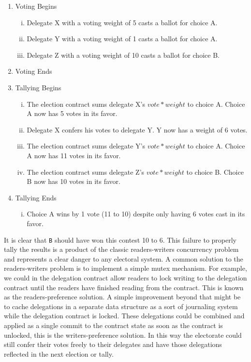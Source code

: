 \begin{enumerate}
    \item Voting Begins
    \begin{enumerate}[i.]
        \item Delegate X with a voting weight of 5 casts a ballot for choice A.
        \item Delegate Y with a voting weight of 1 casts a ballot for choice A.
        \item Delegate Z with a voting weight of 10 casts a ballot for choice B.
    \end{enumerate}
    \item Voting Ends
    \item Tallying Begins
    \begin{enumerate}[i.]
        \item The election contract sums delegate X's $vote*weight$ to choice A.
            Choice A now has 5 votes in its favor.
        \item Delegate X confers his votes to delegate Y. Y now has a weight of
            6 votes.
        \item The election contract sums delegate Y's $vote*weight$ to choice A.
            Choice A now has 11 votes in its favor.
        \item The election contract sums delegate Z's $vote*weight$ to choice B.
            Choice B now has 10 votes in its favor.
    \end{enumerate}
    \item Tallying Ends
    \begin{enumerate}[i.]
        \item Choice A wins by 1 vote (11 to 10) despite only having 6 votes
            cast in its favor.
    \end{enumerate}
\end{enumerate}

It is clear that \lstinline|B| should have won this contest 10 to 6. This
failure to properly tally the results is a product of the classic
readers-writers concurrency problem and represents a clear danger to any
electoral system. A common solution to the readers-writers problem is to
implement a simple mutex mechanism. For example, we could in the delegation
contract allow readers to lock writing to the delegation contract until the
readers have finished reading from the contract.  This is known as the
readers-preference solution. A simple improvement beyond that might be to cache
delegations in a separate data structure as a sort of journaling system while
the delegation contract is locked. These delegations could be combined and
applied as a single commit to the contract state as soon as the contract is
unlocked, this is the writers-preference solution. In this way the electorate
could still confer their votes freely to their delegates and have those
delegations reflected in the next election or tally.

